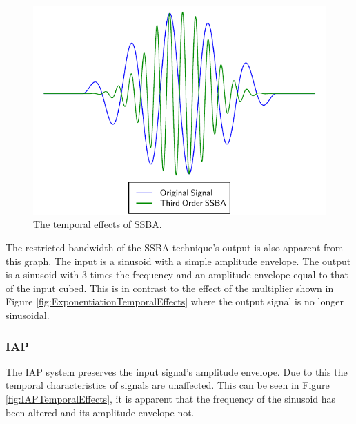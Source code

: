 			\begin{figure}[h!]
				\centering
				\includegraphics{chapter5/Images/SSBATemporalEffects.pdf}
				\caption{The temporal effects of SSBA.}
				\label{fig:SSBATemporalEffects}
			\end{figure}

			The restricted bandwidth of the SSBA technique's output is also apparent from this graph. The input
			is a sinusoid with a simple amplitude envelope. The output is a sinusoid with 3 times the frequency
			and an amplitude envelope equal to that of the input cubed. This is in contrast to the effect of
			the multiplier shown in Figure \ref{fig:ExponentiationTemporalEffects} where the output signal is
			no longer sinusoidal.

		\subsubsection*{IAP}
			The IAP system preserves the input signal's amplitude envelope. Due to this the temporal
			characteristics of signals are unaffected. This can be seen in Figure \ref{fig:IAPTemporalEffects},
			it is apparent that the frequency of the sinusoid has been altered and its amplitude envelope not.

